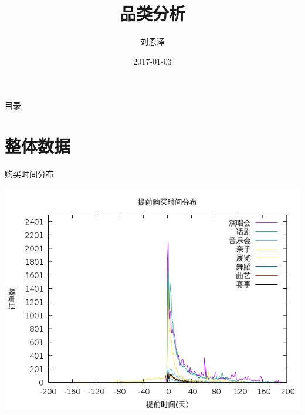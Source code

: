 \documentclass[presentation, bigger]{beamer}
\author{刘恩泽}
\date{2017-01-03}
\title{品类分析}
\begin{document}
\maketitle
\begin{frame}{目录}
\tableofcontents
\end{frame}

\section{整体数据}
\label{sec:org2a13ad8}
\begin{frame}[label={sec:orged2f9cc}]{购买时间分布}
\begin{center}
\includegraphics[width=.9\linewidth]{./image/time-distribution.png}
\end{center}
\end{frame}
\end{document}
